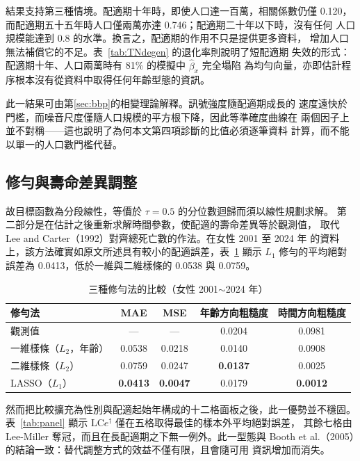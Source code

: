 \documentclass[UTF8, fontset=macnew, a4paper, 12pt]{ctexart}
\newcommand{\LCe}{\mathrm{LC}e^{\dagger}}
\begin{document}
結果支持第三種情境。配適期十年時，即使人口達一百萬，相關係數仍僅 0.120，
而配適期五十五年時人口僅兩萬亦達 0.746；配適期二十年以下時，沒有任何
人口規模能達到 0.8 的水準。換言之，配適期的作用不只是提供更多資料，
增加人口無法補償它的不足。表~\ref{tab:TNdegen} 的退化率則說明了短配適期
失效的形式：配適期十年、人口兩萬時有 81\% 的模擬中 $\hat\beta_x$ 完全塌陷
為均勻向量，亦即估計程序根本沒有從資料中取得任何年齡型態的資訊。

此一結果可由第\ref{sec:bbp}的相變理論解釋。訊號強度隨配適期成長的
速度遠快於門檻，而噪音尺度僅隨人口規模的平方根下降，因此等準確度曲線在
兩個因子上並不對稱——這也說明了為何本文第四項診斷的比值必須逐筆資料
計算，而不能以單一的人口數門檻代替。

\subsection{修勻與壽命差異調整}

故目標函數為分段線性，等價於 $\tau=0.5$ 的分位數迴歸而須以線性規劃求解。
第二部分是在估計之後重新求解時間參數，使配適的壽命差異等於觀測值，
取代 Lee and Carter（1992）對齊總死亡數的作法。在女性 2001 至 2024 年
的資料上，該方法確實如原文所述具有較小的配適誤差，表~\ref{tab:smooth} 顯示
$L_1$ 修勻的平均絕對誤差為 0.0413，低於一維與二維樣條的 0.0538 與 0.0759。

\begin{table}[H]
\centering
\caption{三種修勻法的比較（女性 2001$\sim$2024 年）}
\small
\begin{tabular}{lcccc}
\toprule
修勻法 & MAE & MSE & 年齡方向粗糙度 & 時間方向粗糙度\\
\midrule
觀測值 & --- & --- & 0.0204 & 0.0981\\
一維樣條（$L_2$，年齡） & 0.0538 & 0.0218 & 0.0140 & 0.0908\\
二維樣條（$L_2$） & 0.0759 & 0.0247 & \textbf{0.0137} & 0.0025\\
LASSO（$L_1$） & \textbf{0.0413} & \textbf{0.0047} & 0.0179 & \textbf{0.0012}\\
\bottomrule
\end{tabular}
\label{tab:smooth}
\end{table}

然而把比較擴充為性別與配適起始年構成的十二格面板之後，此一優勢並不穩固。
表~\ref{tab:panel} 顯示 $\LCe$ 僅在五格取得最佳的樣本外平均絕對誤差，
其餘七格由 Lee-Miller 奪冠，而且在長配適期之下無一例外。此一型態與
Booth et al.（2005）的結論一致：替代調整方式的效益不僅有限，且會隨可用
資訊增加而消失。
\end{document}

